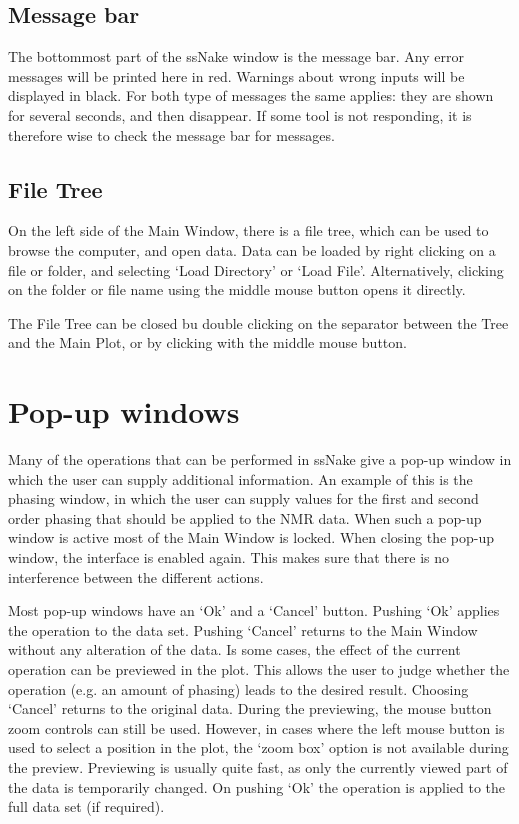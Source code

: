 \documentclass[11pt,a4paper]{article}
\begin{document}
\subsection{Message bar}
The bottommost part of the ssNake window is the message bar. Any error messages will be printed here
in red. Warnings about wrong inputs will be displayed in black. For both type of messages the same
applies: they are shown for several seconds, and then disappear. If some tool is not responding, it
is therefore wise to check the message bar for messages.


\subsection{File Tree}
On the left side of the Main Window, there is a file tree, which can be used to browse the computer,
and open data. Data can be loaded by right clicking on a file or folder, and selecting `Load
Directory' or `Load File'. Alternatively, clicking on the folder or file name using the middle mouse
button opens it directly.

The File Tree can be closed bu double clicking on the separator between the Tree and the Main Plot,
or by clicking with the middle mouse button.







\section{Pop-up windows}
Many of the operations that can be performed in ssNake give a pop-up window in which the user can
supply additional information. An example of this is the phasing window, in which the user can
supply values for the first and second order phasing that should be applied to the NMR data. When
such a pop-up window is active most of the Main Window is locked. When closing the pop-up window,
the interface is enabled again. This makes sure that there is no interference between the different
actions.

Most pop-up windows have an `Ok' and a `Cancel' button. Pushing `Ok' applies the operation to the
data set. Pushing `Cancel' returns to the Main Window without any alteration of the data. Is some
cases, the effect of the current operation can be previewed in the plot. This allows the user to
judge whether the operation (e.g. an amount of phasing) leads to the desired result. Choosing
`Cancel' returns to the original data. During the previewing, the mouse button zoom controls can
still be used. However, in cases where the left mouse button is used to select a position in the
plot, the `zoom box' option is not available during the preview. Previewing is usually quite fast,
as only the currently viewed part of the data is temporarily changed. On pushing `Ok' the operation
is applied to the full data set (if required).
\end{document}
